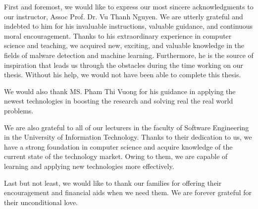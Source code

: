 
\begin{acknowledgements}      


First and foremost, we would like to express our most sincere acknowledgments to our instructor, Assoc Prof. Dr.  Vu Thanh Nguyen. We are utterly grateful and indebted to him for his invaluable instructions, valuable guidance, and continuous moral encouragement. Thanks to his extraordinary experience in computer science and teaching, we acquired new, exciting, and valuable knowledge in the fields of malware detection and machine learning. Furthermore, he is the source of inspiration that leads us through the obstacles during the time working on our thesis. Without his help, we would not have been able to complete this thesis.

We would also thank MS. Pham Thi Vuong for his guidance in applying the newest technologies in boosting the research and solving real the real world problems.

We are also grateful to all of our lecturers in the faculty of Software Engineering in the University of Information Technology. Thanks to their dedication to us, we have a strong foundation in computer science and acquire knowledge of the current state of the technology market. Owing to them, we are capable of learning and applying new technologies more effectively.

Last but not least, we would like to thank our families for offering their encouragement and financial aids when we need them. We are forever grateful for their unconditional love. 

\end{acknowledgements}
